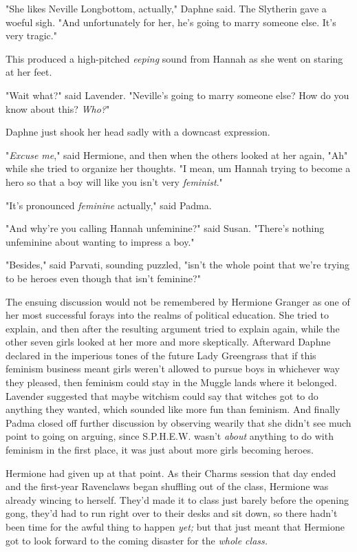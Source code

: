 "She likes Neville Longbottom, actually," Daphne said. The Slytherin gave a
woeful sigh. "And unfortunately for her, he's going to marry someone else. It's
very tragic."

This produced a high-pitched \emph{eeping} sound from Hannah as she went on
staring at her feet.

"Wait what?" said Lavender. "Neville's going to marry someone else? How do you
know about this? \emph{Who?}"

Daphne just shook her head sadly with a downcast expression.

"\emph{Excuse me}," said Hermione, and then when the others looked at her
again, "Ah{\el}" while she tried to organize her thoughts. "I mean,
um{\el} Hannah{\el} trying to become a hero so that a boy will like you
isn't very \emph{feminist}."

"It's pronounced \emph{feminine} actually," said Padma.

"And why're you calling Hannah unfeminine?" said Susan. "There's nothing
unfeminine about wanting to impress a boy."

"Besides," said Parvati, sounding puzzled, "isn't the whole point that we're
trying to be heroes even though that isn't feminine?"

The ensuing discussion would not be remembered by Hermione Granger as one of
her most successful forays into the realms of political education. She tried to
explain, and then after the resulting argument tried to explain again, while
the other seven girls looked at her more and more skeptically. Afterward Daphne
declared in the imperious tones of the future Lady Greengrass that if this
feminism business meant girls weren't allowed to pursue boys in whichever way
they pleased, then feminism could stay in the Muggle lands where it belonged.
Lavender suggested that maybe witchism could say that witches got to do
anything they wanted, which sounded like more fun than feminism. And finally
Padma closed off further discussion by observing wearily that she didn't see
much point to going on arguing, since S.P.H.E.W. wasn't \emph{about} anything
to do with feminism in the first place, it was just about more girls becoming
heroes.

Hermione had given up at that point.
\sbreak
As their Charms session that day ended and the first-year Ravenclaws began
shuffling out of the class, Hermione was already wincing to herself. They'd
made it to class just barely before the opening gong, they'd had to run right
over to their desks and sit down, so there hadn't been time for the awful thing
to happen \emph{yet;} but that just meant that Hermione got to look forward to
the coming disaster for the \emph{whole class.}

